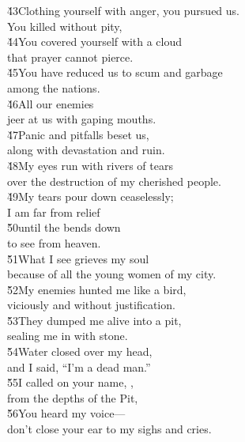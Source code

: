 \begin{poetry}
\poeml \v{43}Clothing yourself with anger, you pursued us. \\
\poemll    You killed without pity, \\
\poeml \v{44}You covered yourself with a cloud \\
\poemll    that prayer cannot pierce. \\
\poeml \v{45}You have reduced us to scum and garbage \\
\poemll    among the nations. \\
\poeml \v{46}All our enemies \\
\poemll    jeer at us with gaping mouths. \\
\poeml \v{47}Panic and pitfalls beset us, \\
\poemll    along with devastation and ruin. \\
\poeml \v{48}My eyes run with rivers of tears \\
\poemll    over the destruction of my cherished people. \\
\poeml \v{49}My tears pour down ceaselessly; \\
\poemll    I am far from relief \\
\poeml \v{50}until the  bends down \\
\poemll    to see from heaven. \\
\poeml \v{51}What I see grieves my soul \\
\poemll    because of all the young women of my city. \\
\poeml \v{52}My enemies hunted me like a bird, \\
\poemll    viciously and without justification. \\
\poeml \v{53}They dumped me alive into a pit, \\
\poemll    sealing me in with stone. \\
\poeml \v{54}Water closed over my head, \\
\poemll    and I said, ``I'm a dead man.'' \\
\poeml \v{55}I called on your name, , \\
\poemll    from the depths of the Pit, \\
\poeml \v{56}You heard my voice--- \\
\poemll    don't close your ear to my sighs and cries. \\

\end{poetry}

